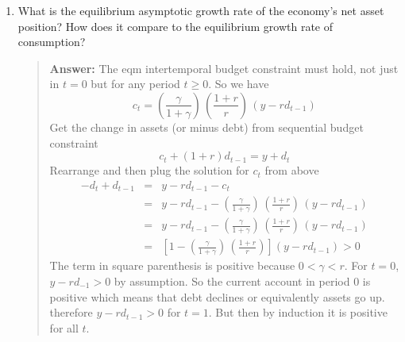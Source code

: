 \begin{exercise}
\begin{enumerate}
\begin{quote}
{\bf Answer: } 
\[
c_t = \beta^{-t} c_0.
\]
Life-time utility then is
\[
\min_{t\ge0} \left\{\beta^ c_t \right\} = \min_{t\ge0} \left\{ \beta^t (\beta^{-t} c_0)\right\} = c_0
\]
Now pick $c_0$ so that it satisfies the eqm intertemporal budget constraint. 
Intermediate steps.
\[
\sum_{t=0}^{\infty} 
\frac{
y
}
{(1+r)^t}
= 
\frac{1+r}{r} y
\]
\[
\sum_{t=0}^{\infty} 
\frac{
c_t
}
{(1+r)^t}
= 
\sum_{t=0}^{\infty} 
\frac{
c_0
}
{[\beta(1+r)]^t}
=
\sum_{t=0}^{\infty} 
\frac{
c_0
}
{(1+\gamma)^t} 
= \frac{1+\gamma}{\gamma} c_0
\]
With those intermediate results in hand we can write the eqm intertemporal budget constraint as 
\[
 (1+r) d_{-1} = \frac{1+r}{r} y - \frac{1+\gamma}{\gamma} c_0
\]
Solve for $c_0$ to obtain: 
\[
c_0 = \left(\frac{\gamma}{1+\gamma}\right) \, \left( \frac{1+r}{r}\right) \, (y -r d_{-1})
\]
This is the equilibrium value of $c_0$ in terms of $\beta$, $r$, $\gamma$, $y$ and  the initial condition $d_{-1}$. 
And for $t\ge 0$
\[
c_t = \beta^{-t}  c_0
\]
With $c_t$ in hand we can find the path of $d_t$. Proceed as follows. For $t=0$, use the sequential budget constraint and solve for $d_0$, which only requires knowledge of $c_0$, $y$, and $d_{-1}$. Once you know $d_0$, use the sequential budget constraint in $t=1$ to find $d_1$. Proceed in this way to find the entire sequence of $d_t$.  
{\bf End of answer}
\end{quote}
\item What is the equilibrium asymptotic growth rate of the economy's net asset position? How does it compare to the equilibrium growth rate of consumption? 
\begin{quote}
{\bf Answer: } 
The eqm intertemporal budget constraint must hold, not just in $t=0$ but for any period $t\ge0$. So we have
\[
c_t = \left(\frac{\gamma}{1+\gamma}\right) \, \left( \frac{1+r}{r}\right) \, (y -r d_{t-1})
\]
Get the change in assets (or minus debt) from sequential budget constraint
\[
c_t + (1+r) d_{t-1} = y + d_t
\]
Rearrange  and then plug the solution for $c_t$ from above
\begin{eqnarray*}
-d_t + d_{t-1} &=& y -r d_{t-1} - c_t \\
 &=& y -r d_{t-1} - \left(\frac{\gamma}{1+\gamma}\right) \, \left( \frac{1+r}{r}\right) \, (y -r d_{t-1})\\
& = &y -r d_{t-1} - \left(\frac{\gamma}{1+\gamma}\right) \, \left( \frac{1+r}{r}\right) \, (y -r d_{t-1})\\
&=& \left[ 1- \left(\frac{\gamma}{1+\gamma}\right) \, \left( \frac{1+r}{r}\right) \right] (y -r d_{t-1})>0
\end{eqnarray*}
The term in square parenthesis is positive because $0<\gamma<r$. For $t=0$, $y-rd_{-1}>0$ by assumption. So the current account in period 0 is positive which means that debt declines or equivalently assets go up. therefore $y-rd_{t-1}>0$ for $t=1$. But then by induction it is positive for all $t$. 


\end{quote}
\end{enumerate}
\end{exercise}
